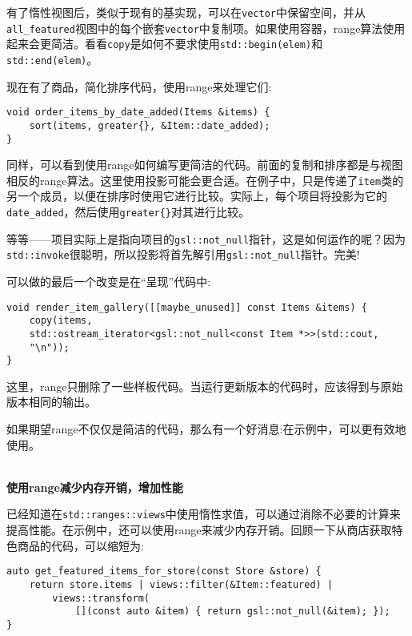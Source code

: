 有了惰性视图后，类似于现有的基实现，可以在\texttt{vector}中保留空间，并从\texttt{all\_featured}视图中的每个嵌套\texttt{vector}中复制项。如果使用容器，range算法使用起来会更简洁。看看\texttt{copy}是如何不要求使用\texttt{std::begin(elem)}和\texttt{std::end(elem)}。

现在有了商品，简化排序代码，使用range来处理它们:

\begin{lstlisting}[style=styleCXX]
void order_items_by_date_added(Items &items) {
	sort(items, greater{}, &Item::date_added);
}
\end{lstlisting}

同样，可以看到使用range如何编写更简洁的代码。前面的复制和排序都是与视图相反的range算法。这里使用投影可能会更合适。在例子中，只是传递了\texttt{item}类的另一个成员，以便在排序时使用它进行比较。实际上，每个项目将投影为它的\texttt{date\_added}，然后使用\texttt{greater\{\}}对其进行比较。

等等——项目实际上是指向项目的\texttt{gsl::not\_null}指针，这是如何运作的呢？因为\texttt{std::invoke}很聪明，所以投影将首先解引用\texttt{gsl::not\_null}指针。完美!

可以做的最后一个改变是在“呈现”代码中:

\begin{lstlisting}[style=styleCXX]
void render_item_gallery([[maybe_unused]] const Items &items) {
	copy(items,
	std::ostream_iterator<gsl::not_null<const Item *>>(std::cout,
	"\n"));
}
\end{lstlisting}

这里，range只删除了一些样板代码。当运行更新版本的代码时，应该得到与原始版本相同的输出。

如果期望range不仅仅是简洁的代码，那么有一个好消息:在示例中，可以更有效地使用。

\hspace*{\fill} \\ %
\noindent
\textbf{使用range减少内存开销，增加性能}

已经知道在\texttt{std::ranges::views}中使用惰性求值，可以通过消除不必要的计算来提高性能。在示例中，还可以使用range来减少内存开销。回顾一下从商店获取特色商品的代码，可以缩短为:

\begin{lstlisting}[style=styleCXX]
auto get_featured_items_for_store(const Store &store) {
	return store.items | views::filter(&Item::featured) |
		views::transform(
			[](const auto &item) { return gsl::not_null(&item); });
}
\end{lstlisting}

